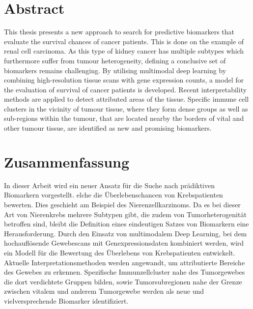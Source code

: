 \documentclass[12pt,a4paper,twoside,]{report}
\begin{document}

\setcounter{page}{1}



\section*{Abstract}

This thesis presents a new approach to search for predictive biomarkers that evaluate the survival chances of cancer patients. This is done on the example of renal cell carcinoma. As this type of kidney cancer has multiple subtypes which furthermore suffer from tumour heterogeneity, defining a conclusive set of biomarkers remains challenging.
By utilising multimodal deep learning by combining high-resolution tissue scans with gene expression counts, a model for the evaluation of survival of cancer patients is developed. Recent interpretability methods are applied to detect attributed areas of the tissue. 
Specific immune cell clusters in the vicinity of tumour tissue, where they form dense groups as well as sub-regions within the tumour, that are located nearby the borders of vital and other tumour tissue, are identified as new and promising biomarkers.


\clearpage
\section*{Zusammenfassung}

In dieser Arbeit wird ein neuer Ansatz für die Suche nach prädiktiven Biomarkern vorgestellt. 
elche die Überlebenschancen von Krebspatienten bewerten. Dies geschieht am Beispiel des Nierenzellkarzinoms. Da es bei dieser Art von Nierenkrebs mehrere Subtypen gibt, die zudem von Tumorheterogenität betroffen sind, bleibt die Definition eines eindeutigen Satzes von Biomarkern eine Herausforderung.
Durch den Einsatz von multimodalem Deep Learning, bei dem hochauflösende Gewebescans mit Genexpressionsdaten kombiniert werden, wird ein Modell für die Bewertung des Überlebens von Krebspatienten entwickelt. Aktuelle Interpretationsmethoden werden angewandt, um attributierte Bereiche des Gewebes zu erkennen. 
Spezifische Immunzellcluster nahe des Tumorgewebes die dort verdichtete Gruppen bilden, sowie 
Tumorsubregionen nahe der Grenze zwischen vitalem und anderem Tumorgewebe werden als neue und vielversprechende Biomarker identifiziert.
\end{document}
